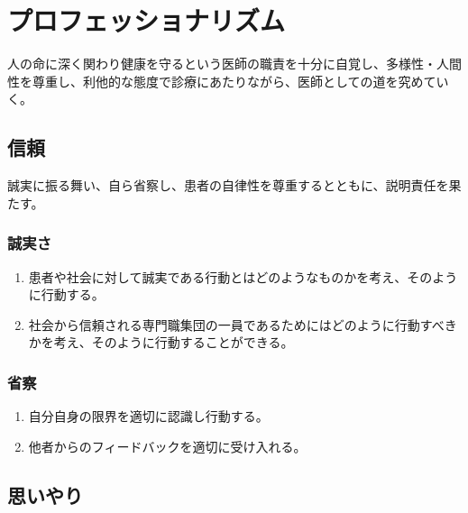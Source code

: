 \newpage

\hypertarget{ux30d7ux30edux30d5ux30a7ux30c3ux30b7ux30e7ux30caux30eaux30baux30e0}{%
\section{プロフェッショナリズム}\label{ux30d7ux30edux30d5ux30a7ux30c3ux30b7ux30e7ux30caux30eaux30baux30e0}}

人の命に深く関わり健康を守るという医師の職責を十分に自覚し、多様性・人間性を尊重し、利他的な態度で診療にあたりながら、医師としての道を究めていく。

\hypertarget{ux4fe1ux983c}{%
\subsection{信頼}\label{ux4fe1ux983c}}

誠実に振る舞い、自ら省察し、患者の自律性を尊重するとともに、説明責任を果たす。

\hypertarget{ux8aa0ux5b9fux3055}{%
\subsubsection{誠実さ}\label{ux8aa0ux5b9fux3055}}

\begin{enumerate}
\def\labelenumi{\arabic{enumi}.}
\tightlist
\item
  患者や社会に対して誠実である行動とはどのようなものかを考え、そのように行動する。
\item
  社会から信頼される専門職集団の一員であるためにはどのように行動すべきかを考え、そのように行動することができる。
\end{enumerate}

\hypertarget{ux7701ux5bdf}{%
\subsubsection{省察}\label{ux7701ux5bdf}}

\begin{enumerate}
\def\labelenumi{\arabic{enumi}.}
\tightlist
\item
  自分自身の限界を適切に認識し行動する。
\item
  他者からのフィードバックを適切に受け入れる。
\end{enumerate}

\hypertarget{ux601dux3044ux3084ux308a}{%
\subsection{思いやり}\label{ux601dux3044ux3084ux308a}}

